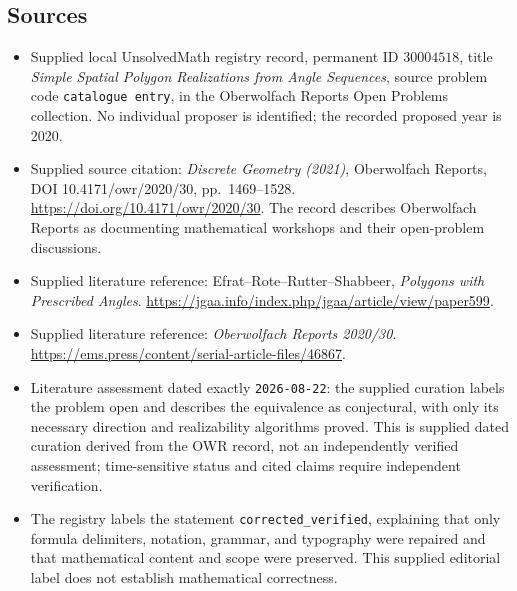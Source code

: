 \documentclass[11pt]{article}
\begin{document}
\subsection{Sources}
\begin{itemize}
\item Supplied local UnsolvedMath registry record, permanent ID \(30004518\), title \emph{Simple Spatial Polygon Realizations from Angle Sequences}, source problem code \texttt{catalogue entry}, in the Oberwolfach Reports Open Problems collection. No individual proposer is identified; the recorded proposed year is 2020.
\item Supplied source citation: \emph{Discrete Geometry (2021)}, Oberwolfach Reports, DOI 10.4171/owr/2020/30, pp.\ 1469--1528. \url{https://doi.org/10.4171/owr/2020/30}. The record describes Oberwolfach Reports as documenting mathematical workshops and their open-problem discussions.
\item Supplied literature reference: Efrat--Rote--Rutter--Shabbeer, \emph{Polygons with Prescribed Angles}. \url{https://jgaa.info/index.php/jgaa/article/view/paper599}.
\item Supplied literature reference: \emph{Oberwolfach Reports 2020/30}. \url{https://ems.press/content/serial-article-files/46867}.
\item Literature assessment dated exactly \texttt{2026-08-22}: the supplied curation labels the problem open and describes the equivalence as conjectural, with only its necessary direction and realizability algorithms proved. This is supplied dated curation derived from the OWR record, not an independently verified assessment; time-sensitive status and cited claims require independent verification.
\item The registry labels the statement \texttt{corrected\_verified}, explaining that only formula delimiters, notation, grammar, and typography were repaired and that mathematical content and scope were preserved. This supplied editorial label does not establish mathematical correctness.
\end{itemize}
\end{document}
